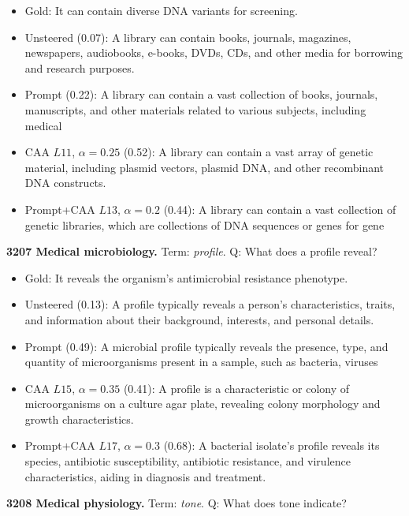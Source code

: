 \begin{itemize}\setlength{\itemsep}{0.15em}\setlength{\parsep}{0pt}\setlength{\topsep}{0.2em}
\item Gold: It can contain diverse DNA variants for screening.
\item Unsteered (0.07): A library can contain books, journals, magazines, newspapers, audiobooks, e-books, DVDs, CDs, and other media for borrowing and research purposes.
\item Prompt (0.22): A library can contain a vast collection of books, journals, manuscripts, and other materials related to various subjects, including medical
\item CAA $L11$, $\alpha=0.25$ (0.52): A library can contain a vast array of genetic material, including plasmid vectors, plasmid DNA, and other recombinant DNA constructs.
\item Prompt+CAA $L13$, $\alpha=0.2$ (0.44): A library can contain a vast collection of genetic libraries, which are collections of DNA sequences or genes for gene
\end{itemize}
\medskip\noindent\textbf{3207 Medical microbiology.} Term: \emph{profile}.
Q: What does a profile reveal?
\begin{itemize}\setlength{\itemsep}{0.15em}\setlength{\parsep}{0pt}\setlength{\topsep}{0.2em}
\item Gold: It reveals the organism's antimicrobial resistance phenotype.
\item Unsteered (0.13): A profile typically reveals a person's characteristics, traits, and information about their background, interests, and personal details.
\item Prompt (0.49): A microbial profile typically reveals the presence, type, and quantity of microorganisms present in a sample, such as bacteria, viruses
\item CAA $L15$, $\alpha=0.35$ (0.41): A profile is a characteristic or colony of microorganisms on a culture agar plate, revealing colony morphology and growth characteristics.
\item Prompt+CAA $L17$, $\alpha=0.3$ (0.68): A bacterial isolate's profile reveals its species, antibiotic susceptibility, antibiotic resistance, and virulence characteristics, aiding in diagnosis and treatment.
\end{itemize}
\medskip\noindent\textbf{3208 Medical physiology.} Term: \emph{tone}.
Q: What does tone indicate?
